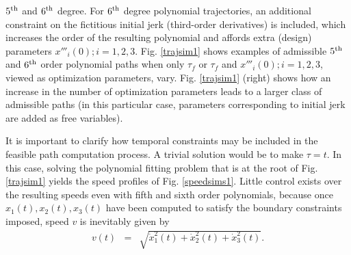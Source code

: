 \documentclass[]{aiaa-tc}%
\begin{document}
$5^{{\rm th}}$ and $6^{{\rm th}}$ degree. For $6^{{\rm th}}$ degree
polynomial trajectories,  an additional constraint on the fictitious initial
jerk (third-order derivatives) is included, which increases the order of the
resulting polynomial and affords extra (design) parameters $ x'''_{i}(0); i
= 1,2,3$.  Fig. \ref{trajsim1} shows examples of admissible $5^{{\rm th}}$
and $6^{{\rm th}}$ order polynomial paths when only $\tau_f$ or $\tau_f$ and
$x'''_{i}(0); i = 1,2,3$, viewed as optimization parameters, vary. Fig.
\ref{trajsim1} (right) shows how an increase in the number of optimization
parameters leads to a larger class of admissible paths (in this particular
case, parameters corresponding to initial jerk are added as free variables).





It is important to clarify how temporal constraints may be included in the
feasible path computation process. A trivial solution would be to make
$\tau=t$. In this case, solving the polynomial fitting problem that is at
the root of Fig. \ref{trajsim1} yields the speed profiles of Fig.
\ref{speedsims1}. Little control exists over the resulting speeds even with
fifth and sixth order polynomials, because once $x_1(t), x_2(t), x_3(t)$
have been computed to satisfy the boundary constraints imposed, speed $v$ is
inevitably given by
\begin{eqnarray}
\label{velocity} v(t) &=& \sqrt{ \dot{x}_{1}^2(t) +
\dot{x}^2_{2}(t) + \dot{x}^2_{3}(t)}.
\end{eqnarray}
\end{document}
